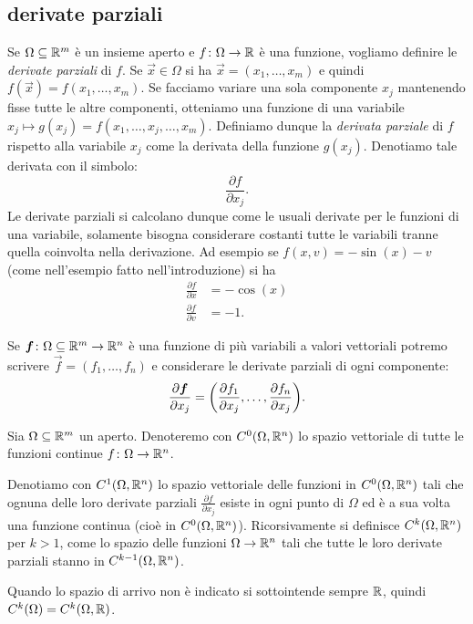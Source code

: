 \subsection{derivate parziali}

Se $\Omega\subseteq {\mathbb R}^m$ è un insieme aperto e $f\colon \Omega \to {\mathbb R}$
è una funzione, vogliamo definire le \emph{derivate parziali} di $f$.
Se $\vec x \in \Omega$ si ha $\vec x = (x_1,\dots, x_m)$ e quindi
$f(\vec x) = f(x_1,\dots, x_m)$. Se facciamo variare una sola componente
$x_j$ mantenendo fisse tutte le altre componenti, otteniamo una funzione
di una variabile $x_j \mapsto g(x_j) = f(x_1,\dots, x_j, \dots, x_m)$.
Definiamo dunque la \emph{derivata parziale}
di $f$ rispetto alla variabile $x_j$ come la derivata della funzione $g(x_j)$.
Denotiamo tale derivata con il simbolo:
\[
  \frac{\partial f}{\partial x_j}.
\]
Le derivate parziali si calcolano dunque come le usuali derivate per le
funzioni di una variabile, solamente bisogna considerare costanti tutte
le variabili tranne quella coinvolta nella derivazione.
Ad esempio se $f(x,v) = -\sin(x) - v$
(come nell'esempio fatto nell'introduzione) si ha
\begin{align*}
  \frac{\partial f}{\partial x} &= -\cos(x)\\
  \frac{\partial f}{\partial v} &= -1.
\end{align*}

Se $\boldsymbol f\colon \Omega \subseteq {\mathbb R}^m \to {\mathbb R}^n$ è una funzione di più
variabili a valori vettoriali potremo scrivere $\vec f = (f_1, \dots, f_n)$
e considerare le derivate parziali di ogni componente:
\[
  \frac{\partial \boldsymbol f}{\partial x_j}
  = {\left( \frac{\partial f_1}{\partial x_j}, \dots, \frac{\partial f_n}{\partial x_j} \right)}.
\]

\begin{definition}
Sia $\Omega\subseteq {\mathbb R}^m$ un aperto. Denoteremo con $C^0(\Omega,{\mathbb R}^n)$
lo spazio vettoriale di tutte le funzioni
continue $f\colon \Omega \to {\mathbb R}^n$.

Denotiamo con $C^1(\Omega,{\mathbb R}^n)$ lo spazio vettoriale
delle funzioni in $C^0(\Omega,{\mathbb R}^n)$ tali che ognuna delle loro derivate
parziali $\frac{\partial f}{\partial x_j}$ esiste in ogni punto di $\Omega$ ed
è a sua volta una funzione continua (cioè in $C^0(\Omega,{\mathbb R}^n)$).
Ricorsivamente si definisce $C^k(\Omega,{\mathbb R}^n)$ per $k>1$,
come lo spazio delle funzioni $\Omega\to{\mathbb R}^n$ tali che tutte le loro derivate
parziali stanno in $C^{k-1}(\Omega,{\mathbb R}^n)$.

Quando lo spazio di arrivo non è indicato si sottointende sempre ${\mathbb R}$, quindi
$C^k(\Omega) = C^k(\Omega,{\mathbb R})$.
\end{definition}

